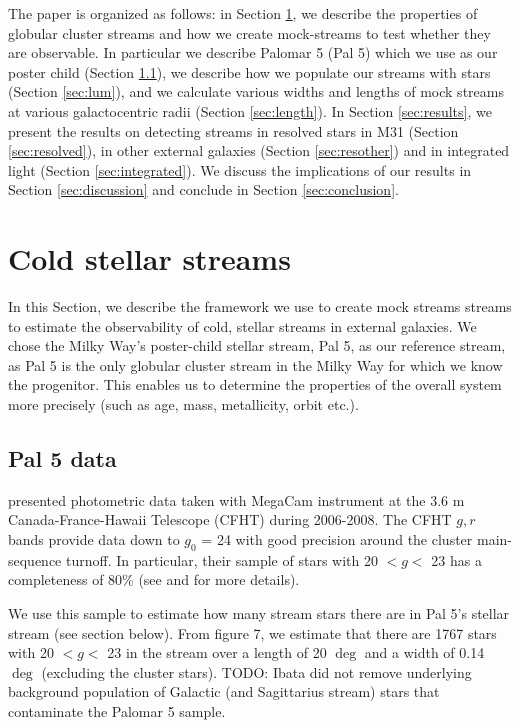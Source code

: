 \documentclass[twocolumn]{aastex62}
\newcommand{\todo}[1]{{\color{red} TODO: #1}}
\begin{document}
The paper is organized as follows: in Section \ref{sec:coldstreams}, we describe the properties of globular cluster streams and how we create mock-streams to test whether they are observable. In particular we describe Palomar 5 (Pal 5) which we use as our poster child (Section \ref{sec:pal5}), we describe how we populate our streams with stars (Section \ref{sec:lum}), and we calculate various widths and lengths of mock streams at various galactocentric radii (Section \ref{sec:length}). In Section \ref{sec:results}, we present the results on detecting streams in resolved stars in M31 (Section \ref{sec:resolved}), in other external galaxies (Section \ref{sec:resother}) and in integrated light (Section \ref{sec:integrated}). We discuss the implications of our results in Section \ref{sec:discussion} and conclude in Section \ref{sec:conclusion}.
%

\section{Cold stellar streams}
\label{sec:coldstreams}
In this Section, we describe the framework we use to create mock streams streams to estimate the observability of cold, stellar streams in external galaxies. We chose the Milky Way's poster-child stellar stream, Pal 5,  as our reference stream, as Pal 5 is the only globular cluster stream in the Milky Way for which we know the progenitor. This enables us to determine the properties of the overall system more precisely (such as age, mass, metallicity, orbit etc.). 

\subsection{Pal 5 data}
\label{sec:pal5}
 \citet{ibata16} presented photometric data taken with MegaCam instrument at the 3.6 m Canada-France-Hawaii Telescope (CFHT) during 2006-2008. The CFHT $g, r$ bands provide data down to $g_0$ = 24 with good precision around the cluster main-sequence turnoff. In particular, their sample of stars with 20 $< g <$ 23 has a completeness of 80\% (see \citealt{ibata16} and \citealt{ibata17} for more details). 
 
We use this sample to estimate how many stream stars there are in Pal 5's stellar stream (see section below). From \citet{ibata16} figure 7, we estimate that there are 1767 stars with 20 $< g <$ 23 in the stream over a length of 20 $\deg$  and a width of 0.14 $\deg$  (excluding the cluster stars). \todo{Ibata did not remove underlying background population of Galactic (and Sagittarius stream) stars that contaminate the Palomar 5 sample.}  
\end{document}
